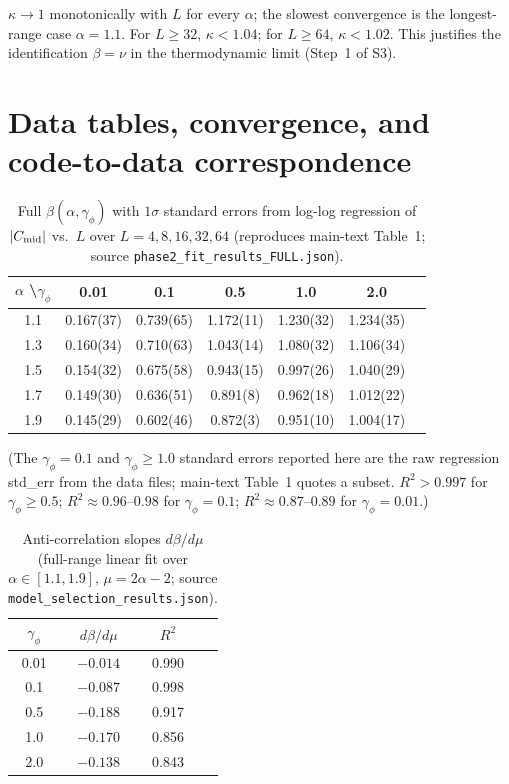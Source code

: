 \documentclass[aps,prb,twocolumn,superscriptaddress]{revtex4-2}
\begin{document}
$\kappa \to 1$ monotonically with $L$ for every $\alpha$; the slowest convergence is the longest-range case $\alpha = 1.1$. For $L \geq 32$, $\kappa < 1.04$; for $L \geq 64$, $\kappa < 1.02$. This justifies the identification $\beta = \nu$ in the thermodynamic limit (Step~1 of S3).

\section{Data tables, convergence, and code-to-data correspondence}
\label{sec:S6}

\begin{table}[h]
\caption{Full $\beta(\alpha, \gamma_\phi)$ with $1\sigma$ standard errors from log-log regression of $|C_{\rm mid}|$ vs.\ $L$ over $L = 4, 8, 16, 32, 64$ (reproduces main-text Table~1; source \texttt{phase2\_fit\_results\_FULL.json}).}
\label{tab:S4}
\begin{ruledtabular}
\begin{tabular}{ccccccc}
$\alpha$ \textbackslash $\gamma_\phi$ & 0.01 & 0.1 & 0.5 & 1.0 & 2.0 \\
\hline
1.1 & 0.167(37) & 0.739(65) & 1.172(11) & 1.230(32) & 1.234(35) \\
1.3 & 0.160(34) & 0.710(63) & 1.043(14) & 1.080(32) & 1.106(34) \\
1.5 & 0.154(32) & 0.675(58) & 0.943(15) & 0.997(26) & 1.040(29) \\
1.7 & 0.149(30) & 0.636(51) & 0.891(8)  & 0.962(18) & 1.012(22) \\
1.9 & 0.145(29) & 0.602(46) & 0.872(3)  & 0.951(10) & 1.004(17) \\
\end{tabular}
\end{ruledtabular}
(The $\gamma_\phi = 0.1$ and $\gamma_\phi \geq 1.0$ standard errors reported here are the raw regression std\_err from the data files; main-text Table~1 quotes a subset. $R^2 > 0.997$ for $\gamma_\phi \geq 0.5$; $R^2 \approx 0.96$--$0.98$ for $\gamma_\phi = 0.1$; $R^2 \approx 0.87$--$0.89$ for $\gamma_\phi = 0.01$.)
\end{table}

\begin{table}[h]
\caption{Anti-correlation slopes $d\beta/d\mu$ (full-range linear fit over $\alpha \in [1.1, 1.9]$, $\mu = 2\alpha - 2$; source \texttt{model\_selection\_results.json}).}
\label{tab:S5}
\begin{ruledtabular}
\begin{tabular}{cccc}
$\gamma_\phi$ & $d\beta/d\mu$ & $R^2$ \\
\hline
0.01 & $-0.014$ & 0.990 \\
0.1  & $-0.087$ & 0.998 \\
0.5  & $-0.188$ & 0.917 \\
1.0  & $-0.170$ & 0.856 \\
2.0  & $-0.138$ & 0.843 \\
\end{tabular}
\end{ruledtabular}
\end{table}
\end{document}
